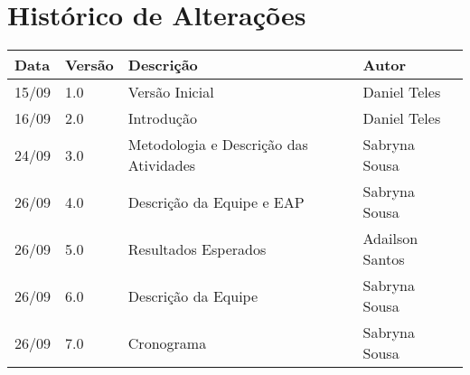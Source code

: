 \chapter*{Histórico de Alterações}

\begin{table}[!htbp]
\centering
\label{my-label}
\begin{tabular}{|l|l|l|l|}
\hline
\textbf{Data} & \textbf{Versão} & \textbf{Descrição} & \textbf{Autor} \\ \hline
15/09         & 1.0             & Versão Inicial     & Daniel Teles   \\ \hline
16/09         & 2.0             & Introdução         & Daniel Teles   \\ \hline
24/09         & 3.0             & Metodologia e Descrição das Atividades       & Sabryna Sousa  \\ \hline
26/09         & 4.0             & Descrição da Equipe e EAP       & Sabryna Sousa  \\ \hline
26/09         & 5.0             & Resultados Esperados       & Adailson Santos  \\ \hline
26/09         & 6.0             & Descrição da Equipe       & Sabryna Sousa  \\ \hline
26/09         & 7.0             & Cronograma       & Sabryna Sousa  \\ \hline


\end{tabular}
\end{table}

\cleardoublepage
